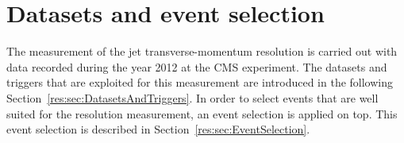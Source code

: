 \FloatBarrier
\chapter{Datasets and event selection}

The measurement of the jet transverse-momentum resolution is carried out with \GAMJET data recorded during the year 2012 at the CMS experiment.
The datasets and triggers that are exploited for this measurement are introduced in the following Section~\ref{res:sec:DatasetsAndTriggers}.
In order to select \GAMJET events that are well suited for the resolution measurement, an event selection is applied on top. %
This event selection is described in Section~\ref{res:sec:EventSelection}.

